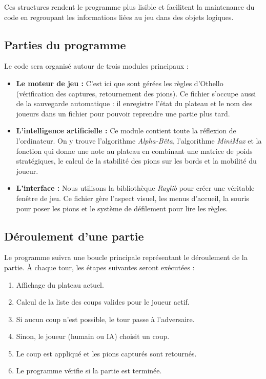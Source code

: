 \documentclass{article}
\begin{document}
Ces structures rendent le programme plus lisible et facilitent la maintenance du code en regroupant les informations liées au jeu dans des objets logiques.

\subsection{Parties du programme}

Le code sera organisé autour de trois modules principaux :

\begin{itemize}
    \item \textbf{Le moteur de jeu :} C'est ici que sont gérées les règles d'Othello (vérification des captures, retournement des pions). Ce fichier s'occupe aussi de la sauvegarde automatique : il enregistre l'état du plateau et le nom des joueurs dans un fichier pour pouvoir reprendre une partie plus tard.
    \item \textbf{L'intelligence artificielle :} Ce module contient toute la réflexion de l'ordinateur. On y trouve l'algorithme \emph{Alpha-Bêta}, l'algorithme \emph{MiniMax} et la fonction qui donne une note au plateau en combinant une matrice de poids stratégiques, le calcul de la stabilité des pions sur les bords et la mobilité du joueur.
    \item \textbf{L'interface :} Nous utilisons la bibliothèque \emph{Raylib} pour créer une véritable fenêtre de jeu. Ce fichier gère l'aspect visuel, les menus d'accueil, la souris pour poser les pions et le système de défilement pour lire les règles.
\end{itemize}


\subsection{Déroulement d'une partie}

Le programme suivra une boucle principale représentant le déroulement de la partie. À chaque tour, les étapes suivantes seront exécutées :

\begin{enumerate}
    \item Affichage du plateau actuel.
    \item Calcul de la liste des coups valides pour le joueur actif.
    \item Si aucun coup n'est possible, le tour passe à l'adversaire.
    \item Sinon, le joueur (humain ou IA) choisit un coup.
    \item Le coup est appliqué et les pions capturés sont retournés.
    \item Le programme vérifie si la partie est terminée.
\end{enumerate}
\end{document}
